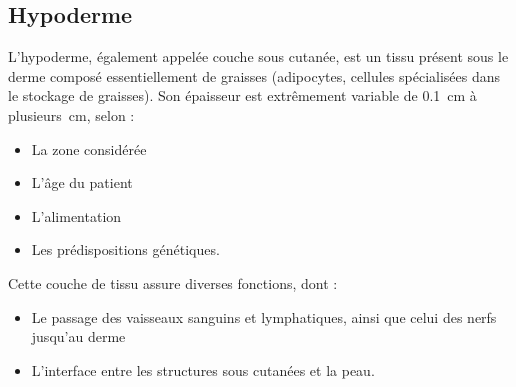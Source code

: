 \addtocounter{footnote}{1}
\clearpage

\subsection{Hypoderme}
L’hypoderme, également appelée couche sous cutanée, est un tissu présent sous le derme composé essentiellement de graisses (adipocytes, cellules spécialisées dans le stockage de graisses). Son épaisseur est extrêmement variable de \SI{0,1}{\centi\metre} à \SI[parse-numbers = false]{plusieurs}{\centi\metre}, selon :
\begin{itemize}
\item La zone considérée
\item L’âge du patient
\item L’alimentation
\item Les prédispositions génétiques.
\end{itemize}\par

Cette couche de tissu assure diverses fonctions, dont :
\begin{itemize}
\item Le passage des vaisseaux sanguins et lymphatiques, ainsi que celui des nerfs jusqu’au derme
\item L’interface entre les structures sous cutanées et la peau.
\end{itemize}\par

